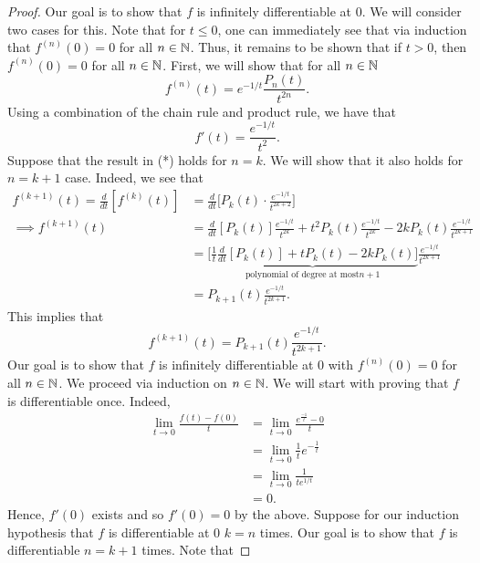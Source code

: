 \documentclass[a4paper]{article}
\begin{document}
\begin{proof}
Our goal is to show that \( f  \) is infinitely differentiable at \( 0  \). We will consider two cases for this. Note that for \( t \leq 0  \), one can immediately see that via induction that \( f^{(n)}(0) = 0  \) for all \( n \in \mathbb{N} \). Thus, it remains to be shown that if \( t > 0  \), then \( f^{(n)}(0) = 0  \) for all \( n \in \mathbb{N} \). First, we will show that for all \( n \in \mathbb{N} \)
\[  f^{(n)}(t) = e^{-1/t} \frac{ {P}_{n}(t) }{ t^{2n} }.   \]
Using a combination of the chain rule and product rule, we have that 
\[ f'(t) = \frac{ e^{-1/t} }{ t^{2} }. \]
Suppose that the result in (*) holds for \( n = k  \). We will show that it also holds for \( n = k +1 \) case. Indeed, we see that 
\begin{align*}
    f^{(k+1)}(t) = \frac{ d }{ dt } [f^{(k)}(t)] &= \frac{ d }{ dt } \Big[ {P}_{k}(t) \cdot \frac{ e^{-1/t} }{ t^{2k+2} } \Big]  \\
    \implies f^{(k+1)}(t) &= \frac{ d }{ dt }  [{P}_{k}(t)] \frac{ e^{-1/t} }{ t^{2k} }  +  t^{2} {P}_{k}(t) \frac{ e^{-1/t} }{ t^{2k} } - 2k {P}_{k}(t) \frac{ e^{-1/t} }{ t^{2k+1} }  \\
                          &= \underbrace{\Big[ \frac{ 1 }{ t } \frac{ d }{ dt } [{P}_{k}(t)] + t {P}_{k}(t) - 2k {P}_{k}(t)\Big]}_{\text{polynomial of degree at most}n+1} \frac{ e^{-1/t} }{ t^{2k+1} }  \\
                          &= {P}_{k+1}(t) \frac{ e^{-1/t} }{ t^{2k+1} }.
\end{align*} 
This implies that 
\[  f^{(k+1)}(t) = {P}_{k+1}(t) \frac{ e^{-1/t} }{ t^{2k+1} }. \]
Our goal is to show that \( f  \) is infinitely differentiable at \( 0  \) with \( f^{(n)} (0) = 0  \) for all \( n \in \mathbb{N} \). We proceed via induction on \( n \in \mathbb{N} \). We will start with proving that \( f  \) is differentiable once. Indeed,  
\begin{align*}
    \lim_{ t \to 0 }  \frac{ f(t) - f(0) }{ t  } &= \lim_{ t \to 0 } \frac{ e^{\frac{ -1 }{ t } } - 0  }{ t  }   \\
                                                 &= \lim_{ t \to 0 }  \frac{ 1 }{ t } e^{- \frac{ 1 }{ t } } \\
                                                 &= \lim_{ t \to 0  }  \frac{ 1 }{ t e^{1/t} } \\
                                                 &= 0.
\end{align*}
Hence, \( f'(0)  \) exists and so \( f'(0) = 0  \) by the above. Suppose for our induction hypothesis that \( f  \) is differentiable at \( 0  \) \( k = n  \) times. Our goal is to show that \( f  \) is differentiable \( n = k + 1  \) times. Note that 

\end{proof}
\end{document}
